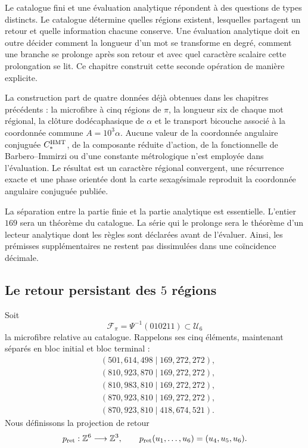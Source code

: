 Le catalogue fini et une évaluation analytique répondent à des questions de types
distincts. Le catalogue détermine quelles régions existent, lesquelles partagent un
retour et quelle information chacune conserve. Une évaluation analytique doit
en outre décider comment la longueur d'un mot se transforme en degré, comment
une branche se prolonge après son retour et avec quel caractère scalaire cette
prolongation se lit. Ce chapitre construit cette seconde opération de manière
explicite.

La construction part de quatre données déjà obtenues dans les chapitres
précédents : la microfibre à cinq régions de \(\pi\), la longueur six de
chaque mot régional, la clôture dodécaphasique de \(\alpha\) et le transport
bicouche associé à la coordonnée commune
\(A=10^3\alpha\). Aucune valeur de la coordonnée angulaire conjuguée \(C_*^{\rm HMT}\), de la composante réduite
d'action, de la fonctionnelle de Barbero--Immirzi ou d'une constante métrologique n'est
employée dans l'évaluation. Le résultat est un caractère régional convergent,
une récurrence exacte et une phase orientée dont la carte sexagésimale reproduit
la coordonnée angulaire conjuguée publiée.

La séparation entre la partie finie et la partie analytique est essentielle. L'entier
\(169\) sera un théorème du catalogue. La série qui le prolonge sera le
théorème d'un lecteur analytique dont les règles sont déclarées avant de l'évaluer.
Ainsi, les prémisses supplémentaires ne restent pas dissimulées dans une coïncidence
décimale.

\subsection{Le retour persistant des \(5\) régions}

Soit
\[
\mathcal F_\pi=\Psi^{-1}(010211)\subset\mathcal U_6
\]
la microfibre relative au catalogue. Rappelons ses cinq éléments, maintenant séparés en bloc initial et bloc terminal :
\[
\begin{aligned}
 &(501,614,498\mid169,272,272),\\
 &(810,923,870\mid169,272,272),\\
 &(810,983,810\mid169,272,272),\\
 &(870,923,810\mid169,272,272),\\
 &(870,923,810\mid418,674,521).
\end{aligned}
\]
Nous définissons la projection de retour
\[
p_{\rm ret}:\mathbb Z^6\longrightarrow\mathbb Z^3,
\qquad
p_{\rm ret}(u_1,\ldots,u_6)=(u_4,u_5,u_6).
\]

